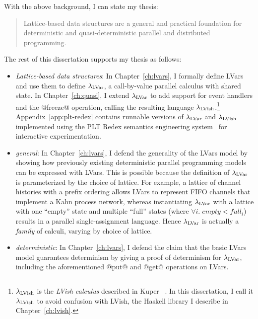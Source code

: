 With the above background, I can state my thesis:
\begin{quote}
  Lattice-based data structures are a general and practical foundation
  for deterministic and quasi-deterministic parallel and distributed
  programming.
\end{quote}
The rest of this dissertation supports my thesis as follows:
\begin{itemize}
  \item \emph{Lattice-based data structures}: In
    Chapter~\ref{ch:lvars}, I formally define LVars and use them to
    define $\lambda_{\textrm{LVar}}$, a call-by-value parallel calculus with
    shared state. In Chapter~\ref{ch:quasi}, I extend $\lambda_{\textrm{LVar}}$ to
    add support for event handlers and the @freeze@ operation, calling
    the resulting language $\lambda_{\textrm{LVish}}$.\footnote{$\lambda_{\textrm{LVish}}$ is
      the \emph{LVish calculus} described in Kuper
      \etal~\cite{Freeze-paper}.  In this dissertation, I call it
      $\lambda_{\textrm{LVish}}$ to avoid confusion with LVish, the Haskell
      library I describe in Chapter~\ref{ch:lvish}.}
    Appendix~\ref{app:plt-redex} contains runnable versions of
    $\lambda_{\textrm{LVar}}$ and $\lambda_{\textrm{LVish}}$ implemented using the PLT Redex
    semantics engineering system~\cite{redex-book} for interactive
    experimentation.

  \item \emph{general}: In Chapter~\ref{ch:lvars}, I defend the
    generality of the LVars model by showing how previously existing
    deterministic parallel programming models can be expressed with
    LVars.  This is possible because the definition of $\lambda_{\textrm{LVar}}$
    is parameterized by the choice of lattice.  For example, a lattice
    of channel histories with a prefix ordering allows LVars to
    represent FIFO channels that implement a Kahn process network,
    whereas instantiating $\lambda_{\textrm{LVar}}$ with a lattice with one
    ``empty'' state and multiple ``full'' states (where $\forall{i}.\;
    \mathit{empty} < \mathit{full_i}$) results in a parallel
    single-assignment language.  Hence $\lambda_{\textrm{LVar}}$ is actually a
    \emph{family} of calculi, varying by choice of lattice.

  \item \emph{deterministic}: In Chapter~\ref{ch:lvars}, I defend the
    claim that the basic LVars model guarantees determinism by giving
    a proof of determinism for $\lambda_{\textrm{LVar}}$, including the
    aforementioned @put@ and @get@ operations on LVars.  


\end{itemize}
